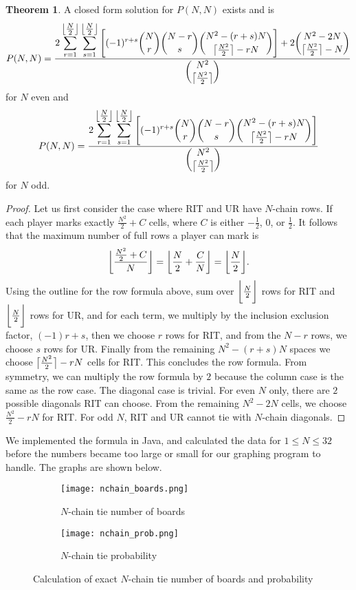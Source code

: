 \documentclass[12pt]{article}
\DeclarePairedDelimiter{\ceil}{\lceil}{\rceil}
\DeclarePairedDelimiter{\floor}{\lfloor}{\rfloor}
\theoremstyle{definition}
\theoremstyle{theorem}
\newtheorem{theorem}{Theorem}
\begin{document}
\begin{theorem}
  A closed form solution for $P(N, N)$ exists and is
  $$P(N, N) = \frac{ \displaystyle
    2 \sum_{r=1}^{\floor[\big]{\tfrac{N}{2}}} \sum_{s=1}^{\floor[\big]{\tfrac{N}{2}}} {\Bigg[ (-1)^{r+s} \binom{N}{r} \binom{N-r}{s} \binom{N^2 - (r+s)N}{\ceil[\big]{\frac{N^2}{2}} - rN}} \Bigg] + 2 \binom{N^2 - 2N}{\ceil[\big]{\frac{N^2}{2}} - N}
  }{ \displaystyle
    \binom{N^2}{\ceil[\big]{\frac{N^2}{2}}}
  }$$
  for $N$ even and
  $$P(N, N) = \frac{ \displaystyle
    2 \sum_{r=1}^{\floor[\big]{\tfrac{N}{2}}} \sum_{s=1}^{\floor[\big]{\tfrac{N}{2}}} {\Bigg[(-1)^{r+s} \binom{N}{r} \binom{N-r}{s} \binom{N^2 - (r+s)N}{\ceil[\big]{\frac{N^2}{2}} - rN}} \Bigg]
  }{ \displaystyle
    \binom{N^2}{\ceil[\big]{\frac{N^2}{2}}}
  }$$
  for $N$ odd.
\end{theorem}

\begin{proof}
  Let us first consider the case where RIT and UR have $N$-chain rows. If each player marks exactly $\frac{N^2}{2} + C$ cells, where $C$ is either $-\frac{1}{2}$, $0$, or $\frac{1}{2}$. It follows that the maximum number of full rows a player can mark is $$\floor[\bigg]{\frac{\frac{N^2}{2} + C}{N}} = \floor[\bigg]{\frac{N}{2} + \frac{C}{N}} = \floor[\bigg]{\frac{N}{2}} \text{.}$$
  Using the outline for the row formula above, sum over $\floor[\bigg]{\frac{N}{2}}$ rows for RIT and $\floor[\bigg]{\frac{N}{2}}$ rows for UR, and for each term, we multiply by the inclusion exclusion factor, $(-1)r+s$, then we choose $r$ rows for RIT, and from the $N-r$ rows, we choose $s$ rows for UR.  Finally from the remaining $N^2-(r+s)N$ spaces we choose $\ceil[\big]{\frac{N^2}{2}} - rN$ cells for RIT. This concludes the row formula.
  From symmetry, we can multiply the row formula by $2$ because the column case is the same as the row case.
  The diagonal case is trivial. For even $N$ only, there are $2$ possible diagonals RIT can choose. From the remaining $N^{2} - 2N$ cells, we choose $\frac{N^2}{2} - rN$ for RIT. For odd $N$, RIT and UR cannot tie with $N$-chain diagonals.
\end{proof}

We implemented the formula in Java, and calculated the data for $1 \leq N \leq 32$ before the numbers became too large or small for our graphing program to handle.  The graphs are shown below.

\begin{figure}[H]
  \centering
  \begin{subfigure}{.5\textwidth}
    \centering
    \texttt{[image: nchain\_boards.png]}
    \caption{$N$-chain tie number of boards}
  \end{subfigure}%
  \begin{subfigure}{.5\textwidth}
    \centering
    \texttt{[image: nchain\_prob.png]}
    \caption{$N$-chain tie probability}
  \end{subfigure}
  \caption{Calculation of exact $N$-chain tie number of boards and probability}
\end{figure}
\end{document}
